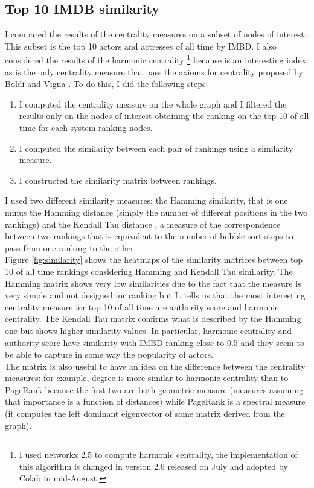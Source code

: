\documentclass{article}
\begin{document}
\subsection{Top 10 IMDB similarity}
I compared the results of the centrality measures on a subset of nodes of interest. This subset is the top 10 actors and actresses of all time by IMBD. I also considered the results of the harmonic centrality \footnote{I used networkx 2.5 to compute harmonic centrality, the implementation of this algorithm is changed in version 2.6 released on July and adopted by Colab in mid-August.} because is an interesting index as is the only centrality measure that pass the axioms for centrality proposed by Boldi and Vigna \cite{Boldi2013}. To do this, I did the following steps:
\begin{enumerate}
    \item I computed the centrality measure on the whole graph and I filtered the results only on the nodes of interest obtaining the ranking on the top 10 of all time for each system ranking nodes.
    \item I computed the similarity between each pair of rankings using a similarity measure.
    \item I constructed the similarity matrix between rankings.
\end{enumerate}
I used two different similarity measures: the Hamming similarity, that is one minus the Hamming distance \cite{Hamming1950} (simply the number of different positions in the two rankings) and the Kendall Tau distance \cite{Hamming}, a measure of the correspondence between two rankings that is equivalent to the number of bubble sort steps to pass from one ranking to the other.\\
Figure \ref{fig:similarity} shows the heatmaps of the similarity matrices between top 10 of all time rankings considering Hamming and Kendall Tau similarity. The Hamming matrix shows very low similarities due to the fact that the measure is very simple and not designed for ranking but It tells us that the most interesting centrality measure for top 10 of all time are authority score and harmonic centrality. The Kendall Tau matrix confirms what is described by the Hamming one but shows higher similarity values. In particular, harmonic centrality and authority score have similarity with IMBD ranking close to 0.5 and they seem to be able to capture in some way the popularity of actors. \\ The matrix is also useful to have an idea on the difference between the centrality measures: for example, degree is more similar to harmonic centrality than to PageRank because the first two are both geometric measure (measures assuming that importance is a function of distances) while PageRank is a spectral measure (it computes the left dominant eigenvector of some matrix derived from the graph).
\end{document}
